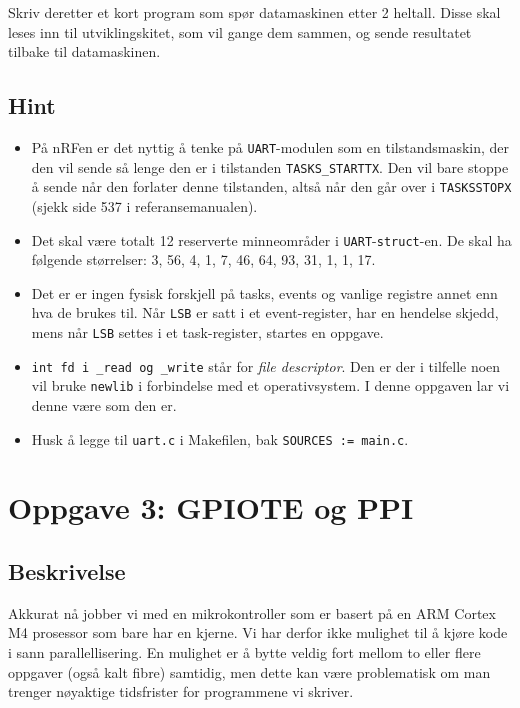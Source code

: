 Skriv deretter et kort program som spør datamaskinen etter 2 heltall. Disse
skal leses inn til utviklingskitet, som vil gange dem sammen, og sende resultatet
tilbake til datamaskinen.

\subsection{Hint}\label{subsec:UART-hint}

\begin{itemize}
    \item På nRFen er det nyttig å tenke på \verb|UART|-modulen som en tilstandsmaskin, der den vil sende så lenge den er i tilstanden \verb|TASKS_STARTTX|. Den vil bare stoppe å sende når den forlater denne tilstanden, altså når den går over i \verb|TASKSSTOPX| (sjekk side 537 i referansemanualen).
    \item Det skal være totalt 12 reserverte minneområder i \verb|UART|-\verb|struct|-en. De skal ha følgende størrelser: 3, 56, 4, 1, 7, 46, 64, 93, 31, 1, 1, 17.
    \item Det er er ingen fysisk forskjell på tasks, events og vanlige registre annet enn hva de brukes til. Når \verb|LSB| er satt i et event-register, har en hendelse skjedd, mens når \verb|LSB| settes i et task-register, startes en oppgave.
    \item \lstinline{int fd i _read og _write} står for \textit{file descriptor}. Den er der i tilfelle noen vil bruke \verb|newlib| i forbindelse med et operativsystem. I denne oppgaven lar vi denne være som den er.
    \item Husk å legge til \verb|uart.c| i Makefilen, bak \verb|SOURCES := main.c|.
\end{itemize}






\section{Oppgave 3: GPIOTE og PPI}
\subsection{Beskrivelse}


Akkurat nå jobber vi med en mikrokontroller som er basert på en ARM Cortex M4 prosessor som bare har en kjerne. Vi har derfor ikke mulighet til å kjøre kode i sann parallellisering. En mulighet er å bytte veldig fort mellom to eller flere oppgaver (også kalt fibre) samtidig, men dette kan være problematisk om man trenger nøyaktige tidsfrister for programmene vi skriver.

